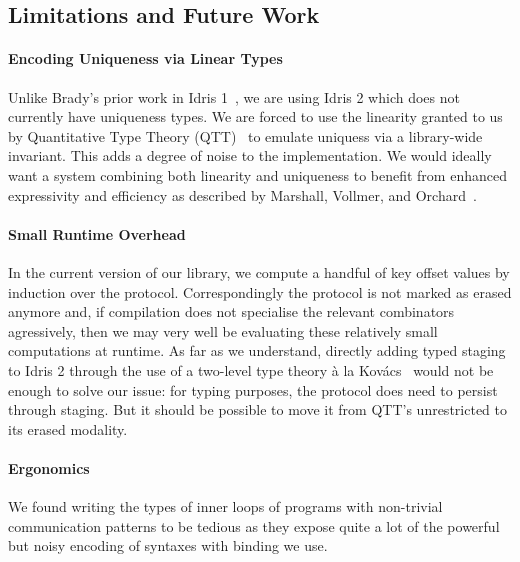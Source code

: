 \documentclass{easychair}
\begin{document}
\subsection*{Limitations and Future Work}

\paragraph{Encoding Uniqueness via Linear Types}
Unlike Brady's prior work in Idris 1~\cite{DBLP:journals/aghcs/Brady17},
we are using Idris 2 which does not currently have uniqueness types.
We are forced to use the linearity granted to us by
Quantitative Type Theory (QTT)~\cite{DBLP:conf/birthday/McBride16,DBLP:conf/lics/Atkey18}
to emulate uniquess via a library-wide invariant.
%
This adds a degree of noise to the implementation.
We would ideally want a system combining both linearity and uniqueness
to benefit from enhanced expressivity and efficiency as described
by Marshall, Vollmer, and Orchard~\cite{DBLP:conf/esop/MarshallVO22}.

\paragraph{Small Runtime Overhead}
In the current version of our library, we compute a handful
of key offset values by induction over the protocol. Correspondingly
the protocol is not marked as erased anymore and, if compilation does
not specialise the relevant combinators agressively, then we may very
well be evaluating these relatively small computations at runtime.
%
As far as we understand, directly adding typed staging to Idris 2
through the use of a two-level type theory à la
Kov{\'{a}}cs~\cite{DBLP:journals/pacmpl/Kovacs22} would not be
enough to solve our issue: for typing purposes, the protocol does need
to persist through staging. But it should be possible to move it
from QTT's unrestricted to its erased modality.

\paragraph{Ergonomics}
We found writing the types of inner loops of programs with non-trivial
communication patterns to be tedious as they expose quite a lot of the
powerful but noisy encoding of syntaxes with binding we use.






\newpage

%
%
%

\end{document}
